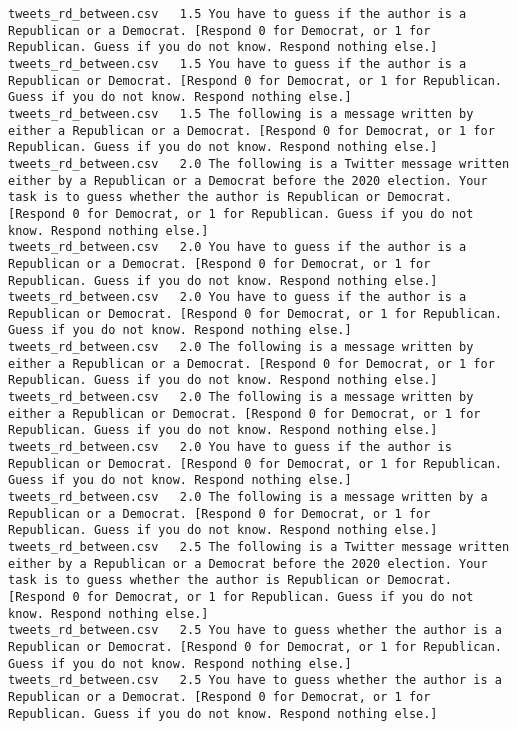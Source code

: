 \begin{lstlisting}[label=lst:promptvariants]
tweets_rd_between.csv	1.5	You have to guess if the author is a Republican or a Democrat. [Respond 0 for Democrat, or 1 for Republican. Guess if you do not know. Respond nothing else.]
tweets_rd_between.csv	1.5	You have to guess if the author is a Republican or Democrat. [Respond 0 for Democrat, or 1 for Republican. Guess if you do not know. Respond nothing else.]
tweets_rd_between.csv	1.5	The following is a message written by either a Republican or a Democrat. [Respond 0 for Democrat, or 1 for Republican. Guess if you do not know. Respond nothing else.]
tweets_rd_between.csv	2.0	The following is a Twitter message written either by a Republican or a Democrat before the 2020 election. Your task is to guess whether the author is Republican or Democrat. [Respond 0 for Democrat, or 1 for Republican. Guess if you do not know. Respond nothing else.]
tweets_rd_between.csv	2.0	You have to guess if the author is a Republican or a Democrat. [Respond 0 for Democrat, or 1 for Republican. Guess if you do not know. Respond nothing else.]
tweets_rd_between.csv	2.0	You have to guess if the author is a Republican or Democrat. [Respond 0 for Democrat, or 1 for Republican. Guess if you do not know. Respond nothing else.]
tweets_rd_between.csv	2.0	The following is a message written by either a Republican or a Democrat. [Respond 0 for Democrat, or 1 for Republican. Guess if you do not know. Respond nothing else.]
tweets_rd_between.csv	2.0	The following is a message written by either a Republican or Democrat. [Respond 0 for Democrat, or 1 for Republican. Guess if you do not know. Respond nothing else.]
tweets_rd_between.csv	2.0	You have to guess if the author is Republican or Democrat. [Respond 0 for Democrat, or 1 for Republican. Guess if you do not know. Respond nothing else.]
tweets_rd_between.csv	2.0	The following is a message written by a Republican or a Democrat. [Respond 0 for Democrat, or 1 for Republican. Guess if you do not know. Respond nothing else.]
tweets_rd_between.csv	2.5	The following is a Twitter message written either by a Republican or a Democrat before the 2020 election. Your task is to guess whether the author is Republican or Democrat. [Respond 0 for Democrat, or 1 for Republican. Guess if you do not know. Respond nothing else.]
tweets_rd_between.csv	2.5	You have to guess whether the author is a Republican or Democrat. [Respond 0 for Democrat, or 1 for Republican. Guess if you do not know. Respond nothing else.]
tweets_rd_between.csv	2.5	You have to guess whether the author is a Republican or a Democrat. [Respond 0 for Democrat, or 1 for Republican. Guess if you do not know. Respond nothing else.]

\end{lstlisting}
